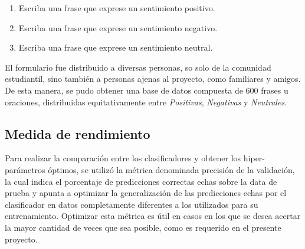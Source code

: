 \documentclass[conference]{IEEEtran}
\begin{document}
        \begin{enumerate}
            \item Escriba una frase que exprese un sentimiento positivo.
            
            \item Escriba una frase que exprese un sentimiento negativo.
            
            \item Escriba una frase que exprese un sentimiento neutral.
        \end{enumerate}
    
        El formulario fue distribuido a diversas personas, so solo de la comunidad estudiantil, sino también a personas ajenas al proyecto, como familiares y amigos. De esta manera, se pudo obtener una base de datos compuesta de 600 frases u oraciones, distribuidas equitativamente entre \textit{Positivas}, \textit{Negativas} y \textit{Neutrales}.
            
        
    
    
    
    
    \subsection{Medida de rendimiento}
    
        Para realizar la comparación entre los clasificadores y obtener los hiper-parámetros óptimos, se utilizó la métrica denominada precisión de la validación, la cual indica el porcentaje de predicciones correctas echas sobre la data de prueba y apunta a optimizar la generalización de las predicciones echas por el clasificador en datos completamente diferentes a los utilizados para su entrenamiento. Optimizar esta métrica es útil en casos en los que se desea acertar la mayor cantidad de veces que sea posible, como es requerido en el presente proyecto.
    
\end{document}
